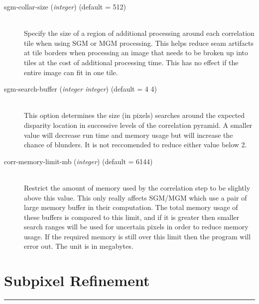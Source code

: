 \begin{description}
\item[sgm-collar-size \textnormal{\small{(\emph{integer})}} (default = 512)]\hfill \\

  Specify the size of a region of additional processing around each correlation tile when
  using SGM or MGM processing.  This helps reduce seam artifacts at tile borders when
  processing an image that needs to be broken up into tiles at the cost of additional
  processing time.  This has no effect if the entire image can fit in one tile.

\item[sgm-search-buffer \textnormal{\small{(\emph{integer integer})}} (default = 4 4)] \hfill \\
  This option determines the size (in pixels) searches around the expected
  disparity location in successive levels of the correlation pyramid.  A smaller
  value will decrease run time and memory usage but will increase the chance of 
  blunders.  It is not reccomended to reduce either value below 2.

\item[corr-memory-limit-mb \textnormal{\small{(\emph{integer})}} (default = 6144)]\hfill \\

  Restrict the amount of memory used by the correlation step to be slightly above this value.
  This only really affects SGM/MGM which use a pair of large memory buffer in their computation.
  The total memory usage of these buffers is compared to this limit, and if it is greater then
  smaller search ranges will be used for uncertain pixels in order to reduce memory usage. If 
  the required memory is still over this limit then the program will error out. The unit is
  in megabytes.

\end{description}



\section{Subpixel Refinement}
\hrule
\bigskip

